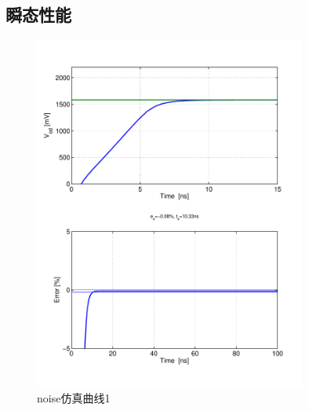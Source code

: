 \documentclass[a4paper]{article}
\begin{document}
\subsection{瞬态性能}
\begin{figure}[htb]
    \begin{center}
        \includegraphics[width=0.8\textwidth]{common/tran1.pdf}
    \end{center}
    \caption{noise仿真曲线1}
    \label{commontran1}
\end{figure}
\end{document}
